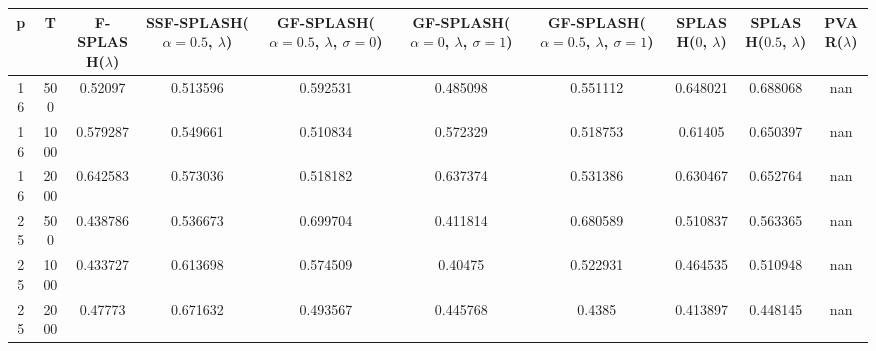 \begin{tabular}{cccccccccc}
\hline
  p  &  T   &  F-SPLASH($\lambda$)  &  SSF-SPLASH($\alpha=0.5$, $\lambda$)  &  GF-SPLASH($\alpha=0.5$, $\lambda$, $\sigma=0$)  &  GF-SPLASH($\alpha=0$, $\lambda$, $\sigma=1$)  &  GF-SPLASH($\alpha=0.5$, $\lambda$, $\sigma=1$)  &  SPLASH($0$, $\lambda$)  &  SPLASH($0.5$, $\lambda$)  &  PVAR($\lambda$)  \\
\hline
 16  & 500  &        0.52097        &               0.513596                &                     0.592531                     &                    0.485098                    &                     0.551112                     &         0.648021         &          0.688068          &        nan        \\
 16  & 1000 &       0.579287        &               0.549661                &                     0.510834                     &                    0.572329                    &                     0.518753                     &         0.61405          &          0.650397          &        nan        \\
 16  & 2000 &       0.642583        &               0.573036                &                     0.518182                     &                    0.637374                    &                     0.531386                     &         0.630467         &          0.652764          &        nan        \\
 25  & 500  &       0.438786        &               0.536673                &                     0.699704                     &                    0.411814                    &                     0.680589                     &         0.510837         &          0.563365          &        nan        \\
 25  & 1000 &       0.433727        &               0.613698                &                     0.574509                     &                    0.40475                     &                     0.522931                     &         0.464535         &          0.510948          &        nan        \\
 25  & 2000 &        0.47773        &               0.671632                &                     0.493567                     &                    0.445768                    &                      0.4385                      &         0.413897         &          0.448145          &        nan        \\
\hline
\end{tabular}